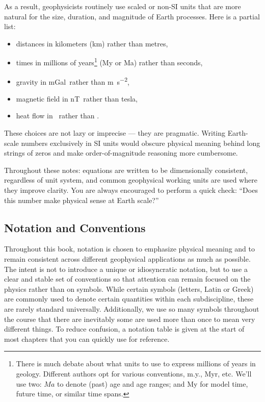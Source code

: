 As a result, geophysicists routinely use scaled or non-SI units that are more natural for the size, duration, and magnitude of Earth processes. Here is a partial list:
\begin{itemize}
    \item distances in kilometers (\si{km}) rather than metres,
    \item times in millions of years\footnote{There is much debate about what units to use to express millions of years in geology.  Different authors opt for various conventions, m.y., \si{Myr}, etc.  We'll use two: $\si{Ma}$ to denote (past) age and age ranges; and \si{My} for model time, future time, or similar time spans.} (\si{My} or \si{Ma}) rather than seconds,
    \item gravity in \si{mGal}\ rather than \si{m.s^{-2}},
    \item magnetic field in \si{nT}\ rather than tesla,
    \item heat flow in \hfu\ rather than \hfu.
\end{itemize}

These choices are not lazy or imprecise — they are pragmatic. Writing Earth-scale numbers exclusively in SI units would obscure physical meaning behind long strings of zeros and make order-of-magnitude reasoning more cumbersome.

Throughout these notes: equations are written to be dimensionally consistent, regardless of unit system, and common geophysical working units are used where they improve clarity.  You are always encouraged to perform a quick check: ``Does this number make physical sense at Earth scale?''

\subsection*{Notation and Conventions}

Throughout this book, notation is chosen to emphasize physical meaning and to remain consistent across different geophysical applications as much as possible. The intent is not to introduce a unique or idiosyncratic notation, but to use a clear and stable set of conventions so that attention can remain focused on the physics rather than on symbols.  While certain symbols (letters, Latin or Greek) are commonly used to denote certain quantities within each subdiscipline, these are rarely standard universally.  Additionally, we use so many symbols throughout the course that there are inevitably some are used more than once to mean very different things.  To reduce confusion, a notation table is given at the start of most chapters that you can quickly use for reference.

